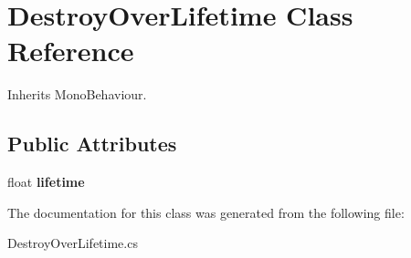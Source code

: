 \hypertarget{class_destroy_over_lifetime}{}\section{Destroy\+Over\+Lifetime Class Reference}
\label{class_destroy_over_lifetime}


Inherits Mono\+Behaviour.

\subsection*{Public Attributes}
\begin{DoxyCompactItemize}
\item 
\mbox{\label{class_destroy_over_lifetime_a9ba9a2796073500391b53955a595c72d}} 
float {\bfseries lifetime}
\end{DoxyCompactItemize}


The documentation for this class was generated from the following file\+:\begin{DoxyCompactItemize}
\item 
Destroy\+Over\+Lifetime.\+cs\end{DoxyCompactItemize}
